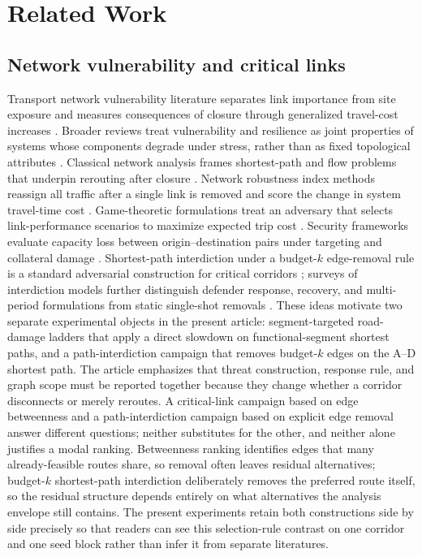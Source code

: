 \documentclass{ieeeaccess}
\begin{document}
\section{Related Work}
\label{sec:related}

\subsection{Network vulnerability and critical links}
Transport network vulnerability literature separates link importance from site exposure and measures consequences of closure through generalized travel-cost increases \cite{b10}. Broader reviews treat vulnerability and resilience as joint properties of systems whose components degrade under stress, rather than as fixed topological attributes \cite{b19}. Classical network analysis frames shortest-path and flow problems that underpin rerouting after closure \cite{b20,b21}. Network robustness index methods reassign all traffic after a single link is removed and score the change in system travel-time cost \cite{b15}. Game-theoretic formulations treat an adversary that selects link-performance scenarios to maximize expected trip cost \cite{b4}. Security frameworks evaluate capacity loss between origin--destination pairs under targeting and collateral damage \cite{b13}. Shortest-path interdiction under a budget-$k$ edge-removal rule is a standard adversarial construction for critical corridors \cite{b28,b29}; surveys of interdiction models further distinguish defender response, recovery, and multi-period formulations from static single-shot removals \cite{b29}. These ideas motivate two separate experimental objects in the present article: segment-targeted road-damage ladders that apply a direct slowdown on functional-segment shortest paths, and a path-interdiction campaign that removes budget-$k$ edges on the A--D shortest path. The article emphasizes that threat construction, response rule, and graph scope must be reported together because they change whether a corridor disconnects or merely reroutes. A critical-link campaign based on edge betweenness and a path-interdiction campaign based on explicit edge removal answer different questions; neither substitutes for the other, and neither alone justifies a modal ranking. Betweenness ranking identifies edges that many already-feasible routes share, so removal often leaves residual alternatives; budget-$k$ shortest-path interdiction deliberately removes the preferred route itself, so the residual structure depends entirely on what alternatives the analysis envelope still contains. The present experiments retain both constructions side by side precisely so that readers can see this selection-rule contrast on one corridor and one seed block rather than infer it from separate literatures.
\end{document}
